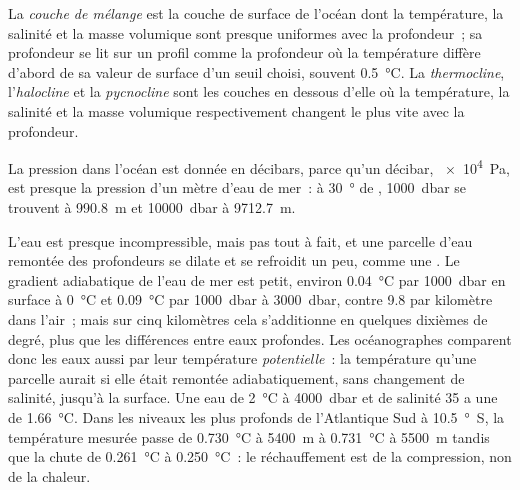 \begin{definition}\label{def:b1:fluid-envelopes-structure:ocean-layers}
La \emph{couche de mélange} est la couche de surface de l'océan
dont la température, la salinité et la masse volumique sont presque uniformes avec la profondeur~; sa
profondeur se lit sur un profil comme la profondeur où la température diffère d'abord
de sa valeur de surface d'un seuil choisi, souvent \qty{0.5}{\celsius}. La
\emph{thermocline}, l'\emph{halocline} et
la \emph{pycnocline} sont les couches en dessous d'elle où la
température, la salinité et la masse volumique respectivement changent le plus vite avec la
profondeur.
\end{definition}

La pression dans l'océan est donnée en décibars, parce qu'un décibar,
\qty{e4}{Pa}, est presque la pression d'un mètre d'eau de mer~: à
\qty{30}{\degree} de , \qty{1000}{dbar} se trouvent à \qty{990.8}{m} et
\qty{10000}{dbar} à \qty{9712.7}{m}.

L'eau est presque incompressible, mais pas tout à fait, et une parcelle d'eau remontée
des profondeurs se dilate et se refroidit un peu, comme une . Le
gradient adiabatique de l'eau de mer est petit, environ \qty{0.04}{\celsius} par
\qty{1000}{dbar} en surface à \qty{0}{\celsius} et \qty{0.09}{\celsius}
par \qty{1000}{dbar} à \qty{3000}{dbar}, contre \num{9.8} par kilomètre dans
l'air~; mais sur cinq kilomètres cela s'additionne en quelques dixièmes de degré, plus que
les différences entre eaux profondes. Les océanographes comparent donc les eaux aussi par
leur température \emph{potentielle}~: la température qu'une parcelle aurait si elle était
remontée adiabatiquement, sans changement de salinité, jusqu'à la surface. Une eau de
\qty{2}{\celsius} à \qty{4000}{dbar} et de salinité 35 a une  de \qty{1.66}{\celsius}. Dans les niveaux les plus profonds de l'Atlantique
Sud à \qty{10.5}{\degree S}, la température mesurée passe de
\qty{0.730}{\celsius} à \qty{5400}{m} à \qty{0.731}{\celsius} à \qty{5500}{m}
tandis que la  chute de \qty{0.261}{\celsius} à
\qty{0.250}{\celsius}~: le réchauffement est de la compression, non de la chaleur.

